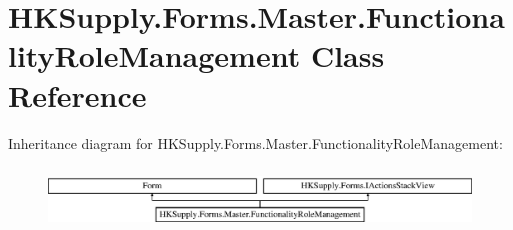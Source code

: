 \hypertarget{class_h_k_supply_1_1_forms_1_1_master_1_1_functionality_role_management}{}\section{H\+K\+Supply.\+Forms.\+Master.\+Functionality\+Role\+Management Class Reference}
\label{class_h_k_supply_1_1_forms_1_1_master_1_1_functionality_role_management}
Inheritance diagram for H\+K\+Supply.\+Forms.\+Master.\+Functionality\+Role\+Management\+:\begin{figure}[H]
\begin{center}
\leavevmode
\includegraphics[height=1.691843cm]{class_h_k_supply_1_1_forms_1_1_master_1_1_functionality_role_management}
\end{center}
\end{figure}
